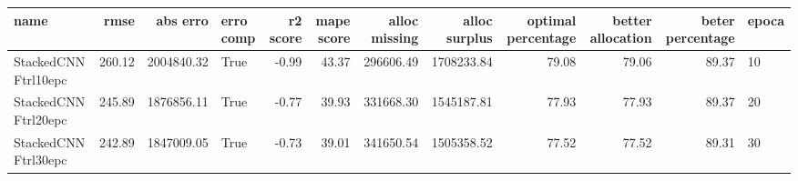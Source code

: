 \begin{tabular}{lrrlrrrrrrrl}
\toprule
name & rmse & abs erro & erro comp & r2 score & mape score & alloc missing & alloc surplus & optimal percentage & better allocation & beter percentage & epoca \\
\midrule
StackedCNN Ftrl10epc & 260.12 & 2004840.32 & True & -0.99 & 43.37 & 296606.49 & 1708233.84 & 79.08 & 79.06 & 89.37 & 10 \\
StackedCNN Ftrl20epc & 245.89 & 1876856.11 & True & -0.77 & 39.93 & 331668.30 & 1545187.81 & 77.93 & 77.93 & 89.37 & 20 \\
StackedCNN Ftrl30epc & 242.89 & 1847009.05 & True & -0.73 & 39.01 & 341650.54 & 1505358.52 & 77.52 & 77.52 & 89.31 & 30 \\
\bottomrule
\end{tabular}
